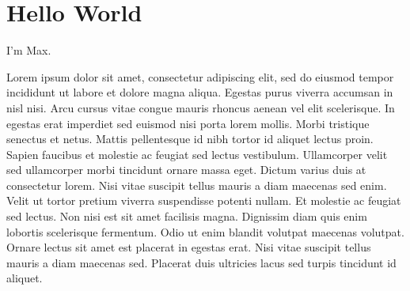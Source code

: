 \documentclass{article}
\begin{document}
\section{Hello World} 

I'm Max.

Lorem ipsum dolor sit amet, consectetur adipiscing elit, sed do eiusmod tempor incididunt ut labore et dolore magna aliqua. Egestas purus viverra accumsan in nisl nisi. Arcu cursus vitae congue mauris rhoncus aenean vel elit scelerisque. In egestas erat imperdiet sed euismod nisi porta lorem mollis. Morbi tristique senectus et netus. Mattis pellentesque id nibh tortor id aliquet lectus proin. Sapien faucibus et molestie ac feugiat sed lectus vestibulum. Ullamcorper velit sed ullamcorper morbi tincidunt ornare massa eget. Dictum varius duis at consectetur lorem. Nisi vitae suscipit tellus mauris a diam maecenas sed enim. Velit ut tortor pretium viverra suspendisse potenti nullam. Et molestie ac feugiat sed lectus. Non nisi est sit amet facilisis magna. Dignissim diam quis enim lobortis scelerisque fermentum. Odio ut enim blandit volutpat maecenas volutpat. Ornare lectus sit amet est placerat in egestas erat. Nisi vitae suscipit tellus mauris a diam maecenas sed. Placerat duis ultricies lacus sed turpis tincidunt id aliquet.
\end{document}
